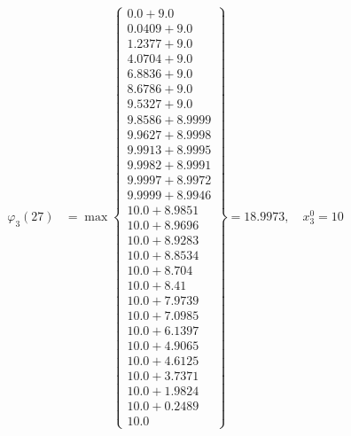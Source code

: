 \documentclass{article}
\begin{document}
\begin{align*}
  
\varphi_{3}(27) &= \max \left\{ \begin{array}{c}
0.0 + 9.0 \\
 0.0409 + 9.0 \\
 1.2377 + 9.0 \\
 4.0704 + 9.0 \\
 6.8836 + 9.0 \\
 8.6786 + 9.0 \\
 9.5327 + 9.0 \\
 9.8586 + 8.9999 \\
 9.9627 + 8.9998 \\
 9.9913 + 8.9995 \\
 9.9982 + 8.9991 \\
 9.9997 + 8.9972 \\
 9.9999 + 8.9946 \\
 10.0 + 8.9851 \\
 10.0 + 8.9696 \\
 10.0 + 8.9283 \\
 10.0 + 8.8534 \\
 10.0 + 8.704 \\
 10.0 + 8.41 \\
 10.0 + 7.9739 \\
 10.0 + 7.0985 \\
 10.0 + 6.1397 \\
 10.0 + 4.9065 \\
 10.0 + 4.6125 \\
 10.0 + 3.7371 \\
 10.0 + 1.9824 \\
 10.0 + 0.2489 \\
 10.0
\end{array} \right\}=18.9973,\quad x_{3}^0=10\\
  
  
  

\end{align*}
\end{document}
